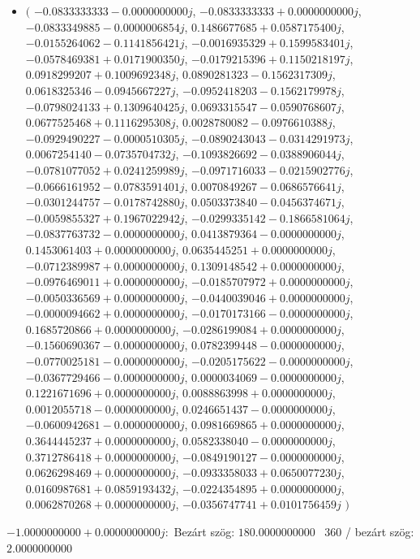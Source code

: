 \documentclass[14pt,a4paper]{article}
\begin{document}
\begin{itemize}
\item
$\big($
$-0.0833333333-0.0000000000j$, $-0.0833333333+0.0000000000j$, $-0.0833349885-0.0000006854j$, $0.1486677685+0.0587175400j$, $-0.0155264062-0.1141856421j$, $-0.0016935329+0.1599583401j$, $-0.0578469381+0.0171900350j$, $-0.0179215396+0.1150218197j$, $0.0918299207+0.1009692348j$, $0.0890281323-0.1562317309j$, $0.0618325346-0.0945667227j$, $-0.0952418203-0.1562179978j$, $-0.0798024133+0.1309640425j$, $0.0693315547-0.0590768607j$, $0.0677525468+0.1116295308j$, $0.0028780082-0.0976610388j$, $-0.0929490227-0.0000510305j$, $-0.0890243043-0.0314291973j$, $0.0067254140-0.0735704732j$, $-0.1093826692-0.0388906044j$, $-0.0781077052+0.0241259989j$, $-0.0971716033-0.0215902776j$, $-0.0666161952-0.0783591401j$, $0.0070849267-0.0686576641j$, $-0.0301244757-0.0178742880j$, $0.0503373840-0.0456374671j$, $-0.0059855327+0.1967022942j$, $-0.0299335142-0.1866581064j$, $-0.0837763732-0.0000000000j$, $0.0413879364-0.0000000000j$, $0.1453061403+0.0000000000j$, $0.0635445251+0.0000000000j$, $-0.0712389987+0.0000000000j$, $0.1309148542+0.0000000000j$, $-0.0976469011+0.0000000000j$, $-0.0185707972+0.0000000000j$, $-0.0050336569+0.0000000000j$, $-0.0440039046+0.0000000000j$, $-0.0000094662+0.0000000000j$, $-0.0170173166-0.0000000000j$, $0.1685720866+0.0000000000j$, $-0.0286199084+0.0000000000j$, $-0.1560690367-0.0000000000j$, $0.0782399448-0.0000000000j$, $-0.0770025181-0.0000000000j$, $-0.0205175622-0.0000000000j$, $-0.0367729466-0.0000000000j$, $0.0000034069-0.0000000000j$, $0.1221671696+0.0000000000j$, $0.0088863998+0.0000000000j$, $0.0012055718-0.0000000000j$, $0.0246651437-0.0000000000j$, $-0.0600942681-0.0000000000j$, $0.0981669865+0.0000000000j$, $0.3644445237+0.0000000000j$, $0.0582338040-0.0000000000j$, $0.3712786418+0.0000000000j$, $-0.0849190127-0.0000000000j$, $0.0626298469+0.0000000000j$, $-0.0933358033+0.0650077230j$, $0.0160987681+0.0859193432j$, $-0.0224354895+0.0000000000j$, $0.0062870268+0.0000000000j$, $-0.0356747741+0.0101756459j$
$\big)$
\end{itemize}
$-1.0000000000+0.0000000000j$:\
Bezárt szög: $180.0000000000$ \
360 / bezárt szög: $2.0000000000$\
\end{document}
